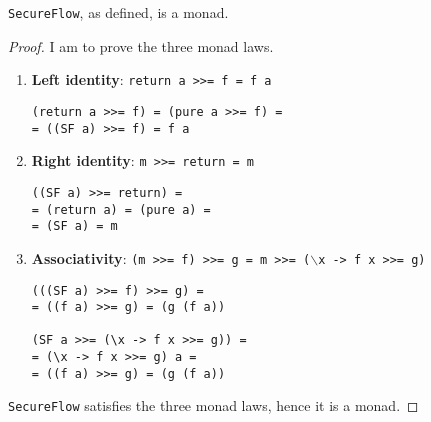 \begin{proposition}
\texttt{SecureFlow}, as defined, is a monad.
\end{proposition}
\begin{proof}
I am to prove the three monad laws. 
\begin{enumerate}
	\item \textbf{Left identity}: \texttt{return a >>= f = f a}
		\begin{lstlisting}
(return a >>= f) = (pure a >>= f) = 
= ((SF a) >>= f) = f a
		\end{lstlisting}
	
	\item \textbf{Right identity}: \texttt{m >>= return = m}
		\begin{lstlisting}
((SF a) >>= return) = 
= (return a) = (pure a) = 
= (SF a) = m
		\end{lstlisting}
	\item \textbf{Associativity}: \texttt{(m >>= f) >>= g = m >>= ($\backslash$x -> f x >>= g)} 
		\begin{lstlisting}
(((SF a) >>= f) >>= g) = 
= ((f a) >>= g) = (g (f a))

(SF a >>= (\x -> f x >>= g)) =
= (\x -> f x >>= g) a = 
= ((f a) >>= g) = (g (f a))
		\end{lstlisting}
\end{enumerate}
\texttt{SecureFlow} satisfies the three monad laws, hence it is a monad.
\end{proof}
